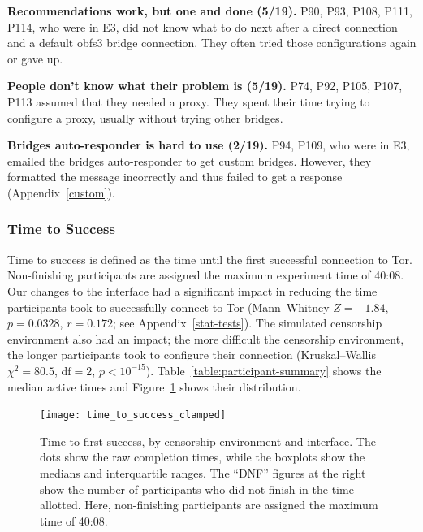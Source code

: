 \documentclass[USenglish,oneside,twocolumn]{article}
\begin{document}
{{\begin{description}
\item {\bfseries Recommendations work, but one and done (5/19).} P90, P93, P108, P111, P114, who were in E3, did not know what to do next after a direct connection and a default obfs3 bridge connection. They often tried those configurations again or gave up. 

\item {\bfseries People don't know what their problem is (5/19).} P74, P92, P105, P107, P113 assumed that they needed a proxy. They spent their time trying to configure a proxy, usually without trying other bridges. 

\item {\bfseries Bridges auto-responder is hard to use (2/19).} P94, P109, who were in E3, emailed the bridges auto-responder to get custom bridges. However, they formatted the message incorrectly and thus failed to get a response (Appendix~\ref{custom}).
\end{description}
} 

\subsubsection{Time to Success} 
Time to success is defined as the time until the first successful connection to Tor. Non-finishing participants are assigned the maximum experiment time of 40:08.  Our changes to the interface had a significant impact in reducing the time participants took to successfully connect to Tor (Mann--Whitney $Z = -1.84$, $p = 0.0328$, $r= 0.172$; see Appendix~\ref{stat-tests}). The simulated censorship environment also had an impact; the more difficult the censorship environment, the longer participants took to configure their connection (Kruskal--Wallis $\chi^2 = 80.5$, $\mbox{df} = 2$, $p < 10^{-15}$). 
Table~\ref{table:participant-summary} shows the median active times and Figure~\ref{fig:time_to_success_clamped} shows their distribution.

\begin{figure}[t]
\centering
\texttt{[image: time\_to\_success\_clamped]}
\caption{
Time to first success, by censorship environment and interface.
The dots show the raw completion times,
while the boxplots show the medians and interquartile ranges.
The ``DNF'' figures at the right show the number of participants 
who did not finish in the time allotted.
Here, non-finishing participants are assigned the maximum time of 40:08.
}
\label{fig:time_to_success_clamped}
\end{figure}

}
\end{document}
